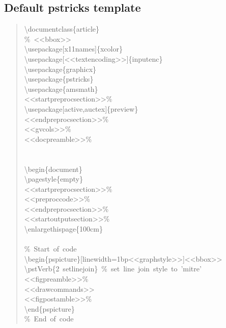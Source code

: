 \documentclass[10pt,a4paper,english]{article}
\begin{document}
\subsection*{Default pstricks template}
\label{default-pstricks-template}
\begin{quote}{\ttfamily \raggedright \noindent
{\textbackslash}documentclass{\{}article{\}}~\\
{\%}~<{}<bbox>{}>~\\
{\textbackslash}usepackage{[}x11names{]}{\{}xcolor{\}}~\\
{\textbackslash}usepackage{[}<{}<textencoding>{}>{]}{\{}inputenc{\}}~\\
{\textbackslash}usepackage{\{}graphicx{\}}~\\
{\textbackslash}usepackage{\{}pstricks{\}}~\\
{\textbackslash}usepackage{\{}amsmath{\}}~\\
<{}<startpreprocsection>{}>{\%}~\\
{\textbackslash}usepackage{[}active,auctex{]}{\{}preview{\}}~\\
<{}<endpreprocsection>{}>{\%}~\\
<{}<gvcols>{}>{\%}~\\
<{}<docpreamble>{}>{\%}~\\
~\\
~\\
{\textbackslash}begin{\{}document{\}}~\\
{\textbackslash}pagestyle{\{}empty{\}}~\\
<{}<startpreprocsection>{}>{\%}~\\
<{}<preproccode>{}>{\%}~\\
<{}<endpreprocsection>{}>{\%}~\\
<{}<startoutputsection>{}>{\%}~\\
{\textbackslash}enlargethispage{\{}100cm{\}}~\\
~\\
{\%}~Start~of~code~\\
{\textbackslash}begin{\{}pspicture{\}}{[}linewidth=1bp<{}<graphstyle>{}>{]}<{}<bbox>{}>~\\
{\textbackslash}pstVerb{\{}2~setlinejoin{\}}~{\%}~set~line~join~style~to~'mitre'~\\
<{}<figpreamble>{}>{\%}~\\
<{}<drawcommands>{}>~\\
<{}<figpostamble>{}>{\%}~\\
{\textbackslash}end{\{}pspicture{\}}~\\
{\%}~End~of~code~\\
}
\end{quote}
\end{document}
